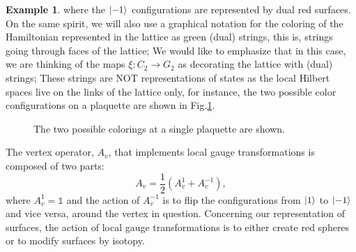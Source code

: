 \documentclass[%
nofootinbib,
 amsmath,amssymb,
aps,
]{revtex4-1}
\theoremstyle{plain}%
\theoremstyle{definition}
\newtheorem{exmp}[thm]{Example}
\theoremstyle{remark}
\begin{document}
\begin{exmp}
where the $\ket{-1}$ configurations are represented by dual red surfaces. On the same spirit, we will also use a graphical notation for the coloring of the Hamiltonian  represented in the lattice as green (dual) strings, this is, strings going through faces of the lattice; We would like to emphasize that in this case, we are thinking of the maps $\xi:C_2 \rightarrow G_2$ as decorating the lattice with (dual) strings; These strings are NOT representations of states as the local Hilbert spaces live on the links of the lattice only, for instance, the two possible color configurations on a plaquette are shown in Fig.\ref{fig:plaqconfig}.

\begin{figure}[h!]
\centering
{}\hspace{30pt}
\caption{\label{fig:plaqconfig} The two possible colorings at a single plaquette are shown.}
\end{figure}

The vertex operator, $A_v$, that implements local gauge transformations is composed of two parts: 
\[A_v=\dfrac{1}{2}(A_v^{1}+A_v^{-1}),\]
where $A_v^1=\mathbb{1}$ and the action of $A_v^{-1}$ is to flip the configurations from $\ket{1}$ to $\ket{-1}$ and vice versa, around the vertex in question. Concerning our representation of surfaces, the action of local gauge transformations is to either create red spheres or to modify surfaces by isotopy. 


\end{exmp}
\end{document}
